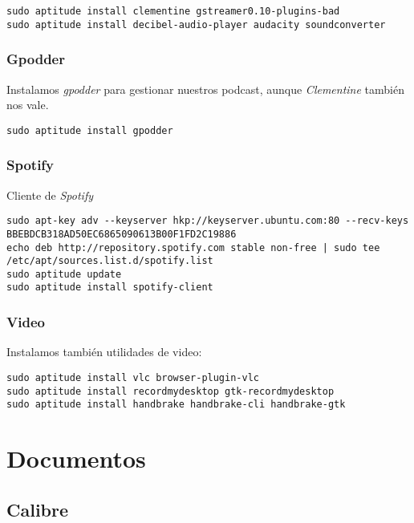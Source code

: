 \documentclass[12pt,spanish,]{article}
\begin{document}
\begin{verbatim}
sudo aptitude install clementine gstreamer0.10-plugins-bad
sudo aptitude install decibel-audio-player audacity soundconverter
\end{verbatim}

\subsubsection{Gpodder}\label{gpodder}

Instalamos \emph{gpodder} para gestionar nuestros podcast, aunque
\emph{Clementine} también nos vale.

\begin{verbatim}
sudo aptitude install gpodder
\end{verbatim}

\subsubsection{Spotify}\label{spotify}

Cliente de \emph{Spotify}

\begin{verbatim}
sudo apt-key adv --keyserver hkp://keyserver.ubuntu.com:80 --recv-keys BBEBDCB318AD50EC6865090613B00F1FD2C19886
echo deb http://repository.spotify.com stable non-free | sudo tee /etc/apt/sources.list.d/spotify.list
sudo aptitude update
sudo aptitude install spotify-client
\end{verbatim}

\subsubsection{Video}\label{video}

Instalamos también utilidades de video:

\begin{verbatim}
sudo aptitude install vlc browser-plugin-vlc
sudo aptitude install recordmydesktop gtk-recordmydesktop
sudo aptitude install handbrake handbrake-cli handbrake-gtk
\end{verbatim}

\section{Documentos}\label{documentos}

\subsection{Calibre}\label{calibre}
\end{document}
